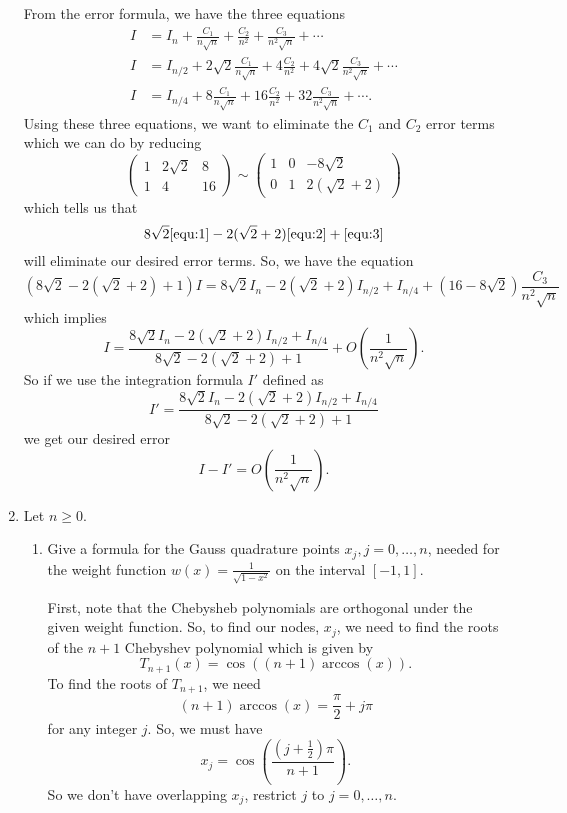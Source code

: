 \documentclass[a4paper,12pt]{article}
\newcommand{\pmat}[1]{\begin{pmatrix} #1 \end{pmatrix}}
\begin{document}
\begin{enumerate}[label = \arabic*.]
		From the error formula, we have the three equations
		\begin{align}
			I &= I_n  + \frac{C_1}{n \sqrt{n}} + \frac{C_2}{n^2} + \frac{C_3}{n^2\sqrt{n}} + \cdots \label{equ:1} \\
			I &= I_{n / 2}  + 2\sqrt{2} \frac{C_1}{n \sqrt{n}} + 4\frac{C_2}{n^2} + 4\sqrt{2}\frac{C_3}{n^2\sqrt{n}} + \cdots \label{equ:2} \\
			I &= I_{n / 4}  + 8\frac{C_1}{n \sqrt{n}} + 16\frac{C_2}{n^2} + 32\frac{C_3}{n^2\sqrt{n}} + \cdots. \label{equ:3}
		\end{align}
		Using these three equations, we want to eliminate the $ C_1 $ and $ C_2 $ error terms which we can do by reducing
		\[
			\pmat{1 & 2\sqrt{2} & 8 \\ 1 & 4 & 16} \sim \pmat{1 & 0 & -8\sqrt{2} \\ 0 & 1 & 2(\sqrt{2} + 2)}
		\]
		which tells us that 
		\[
			8\sqrt{2}\eqref{equ:1} - 2(\sqrt{2} + 2)\eqref{equ:2} + \eqref{equ:3}
		\] 
		will eliminate our desired error terms. So, we have the equation
		\[
			(8\sqrt{2} - 2(\sqrt{2} + 2) + 1) I = 8\sqrt{2}I_n - 2(\sqrt{2} + 2)I_{n/2} + I_{n/4} + (16 - 8\sqrt{2})\frac{C_3}{n^2 \sqrt{n}}
		\]
		which implies
		\[
			I = \frac{8\sqrt{2}I_n - 2(\sqrt{2} + 2)I_{n/2} + I_{n/4}}{8\sqrt{2} - 2(\sqrt{2} + 2) + 1} + O\left(\frac{1}{n^2\sqrt{n}}\right).
		\]
		So if we use the integration formula $ I' $ defined as
		\[
			\boxed{I' = \frac{8\sqrt{2}I_n - 2(\sqrt{2} + 2)I_{n/2} + I_{n/4}}{8\sqrt{2} - 2(\sqrt{2} + 2) + 1}}
		\]
		we get our desired error
		\[
			\boxed{I - I' = O\left(\frac{1}{n^2\sqrt{n}}\right)}.
		\]
		
		\newpage
		\item
			Let $ n \geq 0 $.
			\begin{enumerate}[label = (\roman*)]
				\item Give a formula for the Gauss quadrature points $ x_j, j = 0, \ldots, n $, needed for the weight function $ w(x) = \frac{1}{\sqrt{1 - x^2}} $ on the interval $ [-1, 1] $.
				
				First, note that the Chebysheb polynomials are orthogonal under the given weight function. So, to find our nodes, $ x_j $, we need to find the roots of the $ n + 1 $ Chebyshev polynomial which is given by 
				\[
					T_{n + 1} (x) = \cos((n + 1)\arccos(x)).
				\]
				To find the roots of $ T_{n + 1} $, we need
				\[
					(n + 1) \arccos(x) = \frac{\pi}{2} + j \pi
				\]
				for any integer $ j $. So, we must have
				\[
					\boxed{x_j = \cos\left(\frac{\left(j + \frac{1}{2}\right)\pi}{n + 1}\right).}
				\]
				So we don't have overlapping $ x_j $, restrict $ j $ to $ j = 0, \ldots, n $.
			\end{enumerate}
\end{enumerate}
\end{document}
